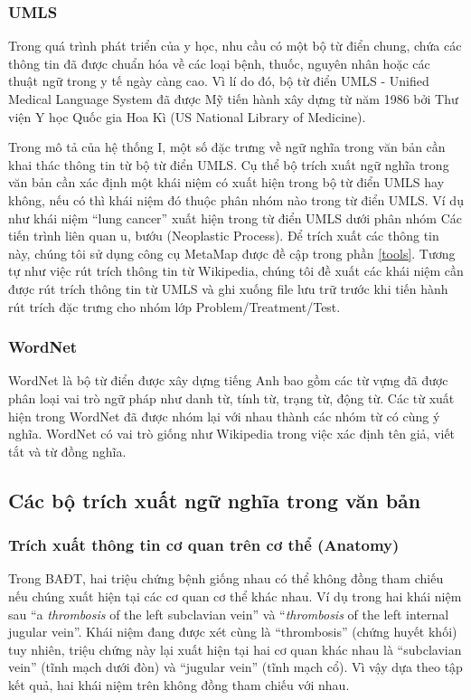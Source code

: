 \subsubsection*{UMLS}
Trong quá trình phát triển của y học, nhu cầu có một bộ từ điển chung, chứa các thông tin đã được chuẩn hóa về các loại bệnh, thuốc, nguyên nhân hoặc các thuật ngữ trong y tế ngày càng cao. Vì lí do đó, bộ từ điển UMLS - Unified Medical Language System đã được Mỹ tiến hành xây dựng từ năm 1986 bởi Thư viện Y học Quốc gia Hoa Kì (US National Library of Medicine).

Trong mô tả của hệ thống I, một số đặc trưng về ngữ nghĩa trong văn bản cần khai thác thông tin từ bộ từ điển UMLS. Cụ thể bộ trích xuất ngữ nghĩa trong văn bản cần xác định một khái niệm có xuất hiện trong bộ từ điển UMLS hay không, nếu có thì khái niệm đó thuộc phân nhóm nào trong từ điển UMLS. Ví dụ như khái niệm ``lung cancer'' xuất hiện trong từ điển UMLS dưới phân nhóm Các tiến trình liên quan u, bướu (Neoplastic Process). Để trích xuất các thông tin này, chúng tôi sử dụng công cụ MetaMap được đề cập trong phần \ref{tools}. Tương tự như việc rút trích thông tin từ Wikipedia, chúng tôi đề xuất các khái niệm cần được rút trích thông tin từ UMLS và ghi xuống file lưu trữ trước khi tiến hành rút trích đặc trưng cho nhóm lớp Problem/Treatment/Test.

\subsubsection*{WordNet}
WordNet là bộ từ điển được xây dựng tiếng Anh bao gồm các từ vựng đã được phân loại vai trò ngữ pháp như danh từ, tính từ, trạng từ, động từ. Các từ xuất hiện trong WordNet đã được nhóm lại với nhau thành các nhóm từ có cùng ý nghĩa. WordNet có vai trò giống như Wikipedia trong việc xác định tên giả, viết tắt và từ đồng nghĩa.

\subsection*{Các bộ trích xuất ngữ nghĩa trong văn bản}

\subsubsection*{Trích xuất thông tin cơ quan trên cơ thể (Anatomy)}
Trong BAĐT, hai triệu chứng bệnh giống nhau có thể không đồng tham chiếu nếu chúng xuất hiện tại các cơ quan cơ thể khác nhau. Ví dụ trong hai khái niệm sau ``a \textit{thrombosis} of the left subclavian vein'' và ``\textit{thrombosis} of the left internal jugular vein''. Khái niệm đang được xét cùng là ``thrombosis'' (chứng huyết khối) tuy nhiên, triệu chứng này lại xuất hiện tại hai cơ quan khác nhau là ``subclavian vein'' (tĩnh mạch dưới đòn) và ``jugular vein'' (tĩnh mạch cổ). Vì vậy dựa theo tập kết quả, hai khái niệm trên không đồng tham chiếu với nhau.

